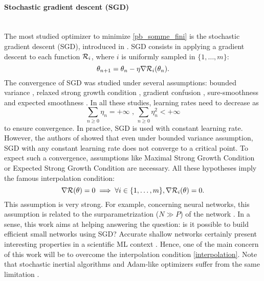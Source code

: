 \paragraph{Stochastic gradient descent (SGD)}
~~\\
The most studied optimizer to minimize \eqref{pb_somme_fini} is the stochastic gradient descent (SGD), introduced in \cite{SGD_Robins}. SGD consists in applying a gradient descent to each function $\mathcal{R}_i$, where $i$ is uniformly sampled in $\{1,\dots,m\}$:
\begin{equation}
	\theta_{n+1} = \theta_n-\eta \nabla \mathcal{R}_i(\theta_n).
	\label{SGD}
\end{equation}
The convergence of SGD was studied under several assumptions:
bounded variance \cite{sgd_general_diminishing_lr,Bertsekas_basis,sgd_dynamical_basis,bertsekas_theorem,SGD_upper_bound}, relaxed strong growth condition \cite{RG_mean,RG_almost_sure}, gradient confusion \cite{gradient_confusion}, sure-smoothness \cite{sure_smoothness_sgd} and expected smoothness \cite{ES_sgd,sgd_descent_condition,ES_sgd,sgd_global_KL}. In all these studies, learning rates need to decrease as
\begin{equation}
	\sum_{n\geq 0} \eta_n = +\infty \text{ , } \sum_{n\geq 0} \eta_n^{2}<+\infty
	\label{diminishing_step}
\end{equation}
to ensure convergence. In practice, SGD is used with constant learning rate. However, the authors of \cite{sgd_prec} showed that even under bounded variance assumption, SGD with any constant learning rate does not converge to a critical point. To expect such a convergence, assumptions like Maximal Strong Growth Condition \cite{MSG_strong_convex,MSG_IG} or Expected Strong Growth Condition \cite{ESG_upper_bound} are necessary. All these hypotheses imply the famous interpolation condition:
\begin{equation}
  \nabla \mathcal{R}(\theta)=0 \implies \forall i\in\{1,\dots,m\}, \nabla \mathcal{R}_i(\theta)=0.
	\label{interpolation}
\end{equation}
This assumption is very strong. For example, concerning neural networks, this assumption is related to the surparametrization ($N\gg P$) of the network \cite{ESG_upper_bound,ESG_IG}. 
In a sense, this work aims at helping answering the question: is it possible to build efficient small networks using SGD?
Accurate shallow networks certainly present interesting properties in a {scientific ML context \cite{FV_scheme,reentry,acc_newt,FRANCK,plasma,KluthRipoll}}. 
Hence, one of the main concern of this work will be to overcome the interpolation condition \eqref{interpolation}. Note that stochastic inertial algorithms and Adam-like optimizers suffer from the same limitation \cite{sgd_prec,adam1,adam2,zou_rms,rms_not_bounded}.

